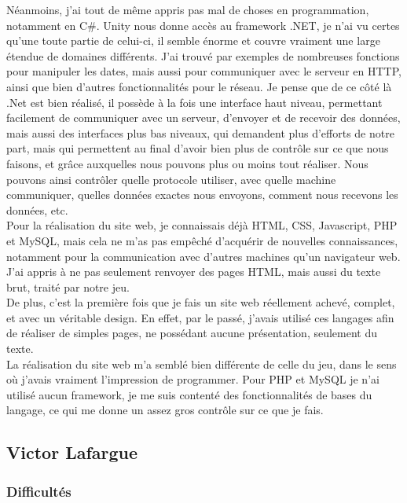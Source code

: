 \documentclass[12pt]{article}
\begin{document}
Néanmoins, j'ai tout de même appris pas mal de choses en programmation, notamment en C\#. Unity nous donne accès au framework .NET, je n'ai vu certes qu'une toute partie de celui-ci, il semble énorme et couvre vraiment une large étendue de domaines différents. J'ai trouvé par exemples de nombreuses fonctions pour manipuler les dates, mais aussi pour communiquer avec le serveur en HTTP, ainsi que bien d'autres fonctionnalités pour le réseau. Je pense que de ce côté là .Net est bien réalisé, il possède à la fois une interface haut niveau, permettant facilement de communiquer avec un serveur, d'envoyer et de recevoir des données, mais aussi des interfaces plus bas niveaux, qui demandent plus d'efforts de notre part, mais qui permettent au final d'avoir bien plus de contrôle sur ce que nous faisons, et grâce auxquelles nous pouvons plus ou moins tout réaliser. Nous pouvons ainsi contrôler quelle protocole utiliser, avec quelle machine communiquer, quelles données exactes nous envoyons, comment nous recevons les données, etc.\\

Pour la réalisation du site web, je connaissais déjà HTML, CSS, Javascript, PHP et MySQL, mais cela ne m'as pas empêché d'acquérir de nouvelles connaissances, notamment pour la communication avec d'autres machines qu'un navigateur web. J'ai appris à ne pas seulement renvoyer des pages HTML, mais aussi du texte brut, traité par notre jeu.\\
De plus, c'est la première fois que je fais un site web réellement achevé, complet, et avec un véritable design. En effet, par le passé, j'avais utilisé ces langages afin de réaliser de simples pages, ne possédant aucune présentation, seulement du texte.\\
La réalisation du site web m'a semblé bien différente de celle du jeu, dans le sens où j'avais vraiment l'impression de programmer. Pour PHP et MySQL je n'ai utilisé aucun framework, je me suis contenté des fonctionnalités de bases du langage, ce qui me donne un assez gros contrôle sur ce que je fais.


\subsection{Victor Lafargue}

\subsubsection{Difficultés}
\end{document}

